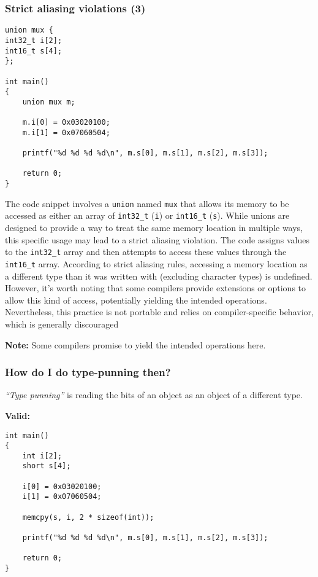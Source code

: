 \documentclass[12pt]{article}
\begin{document}
\subsubsection{Strict aliasing violations (3)}
\begin{lstlisting}
union mux {
int32_t i[2];
int16_t s[4];
};

int main()
{
    union mux m;

    m.i[0] = 0x03020100;
    m.i[1] = 0x07060504;

    printf("%d %d %d %d\n", m.s[0], m.s[1], m.s[2], m.s[3]);

    return 0;
}
\end{lstlisting}
The code snippet involves a \texttt{union} named \texttt{mux} that allows its memory to be accessed as either an array of \texttt{int32\_t} (\texttt{i}) or \texttt{int16\_t} (\texttt{s}). While unions are designed to provide a way to treat the same memory location in multiple ways, this specific usage may lead to a strict aliasing violation. The code assigns values to the \texttt{int32\_t} array and then attempts to access these values through the \texttt{int16\_t} array. According to strict aliasing rules, accessing a memory location as a different type than it was written with (excluding character types) is undefined.\\ However, it's worth noting that some compilers provide extensions or options to allow this kind of access, potentially yielding the intended operations. Nevertheless, this practice is not portable and relies on compiler-specific behavior, which is generally discouraged

\textbf{Note:} Some compilers promise to yield the intended operations here.

\subsubsection{How do I do type-punning then?}

\textit{``Type punning''} is reading the bits of an object as an object of a different type.

\textbf{Valid:}

\begin{lstlisting}
int main()
{
    int i[2];
    short s[4];

    i[0] = 0x03020100;
    i[1] = 0x07060504;

    memcpy(s, i, 2 * sizeof(int));

    printf("%d %d %d %d\n", m.s[0], m.s[1], m.s[2], m.s[3]);

    return 0;
}
\end{lstlisting}
\end{document}
